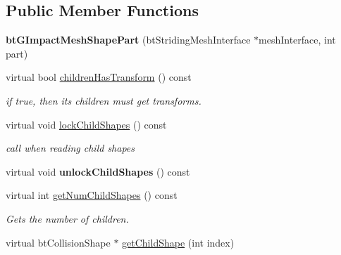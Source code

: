 \subsection*{Public Member Functions}
\begin{DoxyCompactItemize}
\item 
\hypertarget{classbt_g_impact_mesh_shape_part_a2e3ad6d2af64c321af6ce23e16aa2828}{{\bfseries bt\+G\+Impact\+Mesh\+Shape\+Part} (bt\+Striding\+Mesh\+Interface $\ast$mesh\+Interface, int part)}\label{classbt_g_impact_mesh_shape_part_a2e3ad6d2af64c321af6ce23e16aa2828}

\item 
\hypertarget{classbt_g_impact_mesh_shape_part_af18e961ae68efad13341caec2468f3be}{virtual bool \hyperlink{classbt_g_impact_mesh_shape_part_af18e961ae68efad13341caec2468f3be}{children\+Has\+Transform} () const }\label{classbt_g_impact_mesh_shape_part_af18e961ae68efad13341caec2468f3be}

\begin{DoxyCompactList}\small\item\em if true, then its children must get transforms. \end{DoxyCompactList}\item 
\hypertarget{classbt_g_impact_mesh_shape_part_aaa566ccda52bd19942c8e72fabdc21fa}{virtual void \hyperlink{classbt_g_impact_mesh_shape_part_aaa566ccda52bd19942c8e72fabdc21fa}{lock\+Child\+Shapes} () const }\label{classbt_g_impact_mesh_shape_part_aaa566ccda52bd19942c8e72fabdc21fa}

\begin{DoxyCompactList}\small\item\em call when reading child shapes \end{DoxyCompactList}\item 
\hypertarget{classbt_g_impact_mesh_shape_part_a16b38327e937e5d7d705b816c53914e1}{virtual void {\bfseries unlock\+Child\+Shapes} () const }\label{classbt_g_impact_mesh_shape_part_a16b38327e937e5d7d705b816c53914e1}

\item 
\hypertarget{classbt_g_impact_mesh_shape_part_a95797b2cac67f4e41a03c3d901f3c085}{virtual int \hyperlink{classbt_g_impact_mesh_shape_part_a95797b2cac67f4e41a03c3d901f3c085}{get\+Num\+Child\+Shapes} () const }\label{classbt_g_impact_mesh_shape_part_a95797b2cac67f4e41a03c3d901f3c085}

\begin{DoxyCompactList}\small\item\em Gets the number of children. \end{DoxyCompactList}\item 
\hypertarget{classbt_g_impact_mesh_shape_part_a9dfb2b28e136ec3b08127f6b47cefb89}{virtual bt\+Collision\+Shape $\ast$ \hyperlink{classbt_g_impact_mesh_shape_part_a9dfb2b28e136ec3b08127f6b47cefb89}{get\+Child\+Shape} (int index)}\label{classbt_g_impact_mesh_shape_part_a9dfb2b28e136ec3b08127f6b47cefb89}


\end{DoxyCompactItemize}
